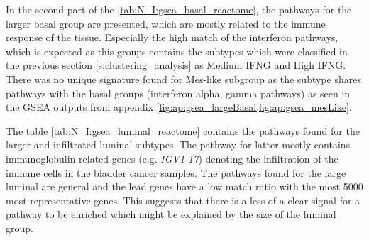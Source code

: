 In the second part of the \cref{tab:N_I:gsea_basal_reactome}, the pathways for the larger basal group are presented, which are mostly related to the immune response of the tissue. Especially the high match of the interferon pathways, which is expected as this groups contains the subtypes which were classified in the previous section \cref{s:clustering_analysis} as Medium IFNG and High IFNG. There was no unique signature found for Mes-like subgroup as the subtype shares pathways with the basal groups (interferon alpha, gamma pathways) as seen in the GSEA outputs from appendix \cref{fig:ap:gsea_largeBasal,fig:ap:gsea_mesLike}.

The table \cref{tab:N_I:gsea_luminal_reactome} contains the pathways found for the larger and infiltrated luminal subtypes. The pathway for latter mostly contains immunoglobulin related genes (e.g. \textit{IGV1-17}) denoting the infiltration of the immune cells in the bladder cancer samples. The pathways found for the large luminal are general and the lead genes have a low match ratio with the most 5000 most representative genes. This suggests that there is a less of a clear signal for a pathway to be enriched which might be explained by the size of the luminal group. 

